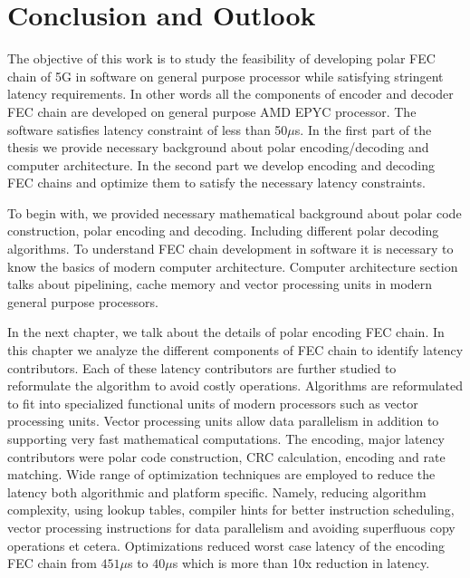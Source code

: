 \chapter{Conclusion and Outlook} \label{chap:conclusion}
The objective of this work is to study the feasibility of developing polar FEC chain of 5G in software on general purpose processor while satisfying stringent latency requirements. In other words all the components of encoder and decoder FEC chain are developed on general purpose AMD EPYC processor. The software satisfies latency constraint of less than 50$\mu$s. In the first part of the thesis we provide necessary background about polar encoding/decoding and computer architecture. In the second part we develop encoding and decoding FEC chains and optimize them to satisfy the necessary latency constraints. \newline

To begin with, we provided necessary mathematical background about polar code construction, polar encoding and decoding. Including different polar decoding algorithms. To understand FEC chain development in software it is necessary to know the basics of modern computer architecture. Computer architecture section talks about pipelining, cache memory and vector processing units in modern general purpose processors. \newline

In the next chapter, we talk about the details of polar encoding FEC chain. In this chapter we analyze the different components of FEC chain to identify latency contributors. Each of these latency contributors are further studied to reformulate the algorithm to avoid costly operations. Algorithms are reformulated to fit into specialized functional units of modern processors such as vector processing units. Vector processing units allow data parallelism in addition to supporting very fast mathematical computations. The encoding,  major latency contributors were polar code construction, CRC calculation, encoding and rate matching. Wide range of optimization techniques are employed to reduce the latency both algorithmic and platform specific. Namely, reducing algorithm complexity, using lookup tables, compiler hints for better instruction scheduling, vector processing instructions for data parallelism and avoiding superfluous copy operations et cetera. Optimizations reduced worst case latency of the encoding FEC chain from $451 \mu$s to $40\mu$s which is more than 10x reduction in latency. \newline

